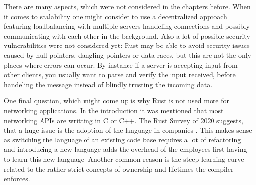There are many aspects, which were not considered in the chapters before. When it comes to scalability one might
consider to use a decentralized approach featuring loadbalancing with multiple servers handeling connections and
possibly communicating with each other in the background. Also a lot of possible security vulnerabilities were not
considered yet: Rust may be able to avoid security issues caused by null pointers, dangling pointers or data races, but
this are not the only places where errors can occur. By instance if a server is accepting input from other clients, you
usually want to parse and verify the input received, before handeling the message instead of blindly trusting the
incoming data.

One final question, which might come up is why Rust is not used more for networking applications. In the introduction
it was mentioned that most networking APIs are writting in C or C++. The Rust Survey of 2020 suggests, that a huge
issue is the adoption of the language in companies \cite{rust-survey}. This makes sense as switching the language of an
existing code base requires a lot of refactoring and introducing a new language adds the overhead of the employees
first having to learn this new language. Another common reason is the steep learning curve related to the rather strict
concepts of ownership and lifetimes the compiler enforces.

